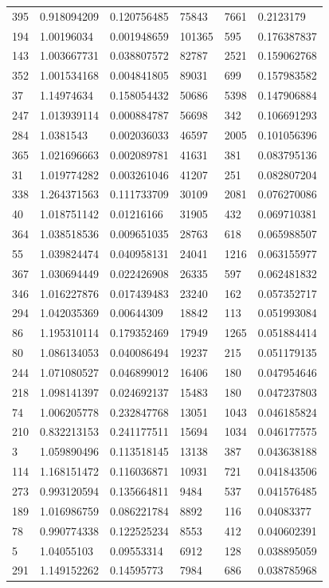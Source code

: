 \documentclass{cumcmthesis}
\begin{document}
\begin{longtable}{l|llll|l}
    395 & 0.918094209 & 0.120756485 & 75843  & 7661    & 0.2123179   \\
    194 & 1.00196034  & 0.001948659 & 101365 & 595     & 0.176387837 \\
    143 & 1.003667731 & 0.038807572 & 82787  & 2521    & 0.159062768 \\
    352 & 1.001534168 & 0.004841805 & 89031  & 699     & 0.157983582 \\
    37  & 1.14974634  & 0.158054432 & 50686  & 5398    & 0.147906884 \\
    247 & 1.013939114 & 0.000884787 & 56698  & 342     & 0.106691293 \\
    284 & 1.0381543   & 0.002036033 & 46597  & 2005    & 0.101056396 \\
    365 & 1.021696663 & 0.002089781 & 41631  & 381     & 0.083795136 \\
    31  & 1.019774282 & 0.003261046 & 41207  & 251     & 0.082807204 \\
    338 & 1.264371563 & 0.111733709 & 30109  & 2081    & 0.076270086 \\
    40  & 1.018751142 & 0.01216166  & 31905  & 432     & 0.069710381 \\
    364 & 1.038518536 & 0.009651035 & 28763  & 618     & 0.065988507 \\
    55  & 1.039824474 & 0.040958131 & 24041  & 1216    & 0.063155977 \\
    367 & 1.030694449 & 0.022426908 & 26335  & 597     & 0.062481832 \\
    346 & 1.016227876 & 0.017439483 & 23240  & 162     & 0.057352717 \\
    294 & 1.042035369 & 0.00644309  & 18842  & 113     & 0.051993084 \\
    86  & 1.195310114 & 0.179352469 & 17949  & 1265    & 0.051884414 \\
    80  & 1.086134053 & 0.040086494 & 19237  & 215     & 0.051179135 \\
    244 & 1.071080527 & 0.046899012 & 16406  & 180     & 0.047954646 \\
    218 & 1.098141397 & 0.024692137 & 15483  & 180     & 0.047237803 \\
    74  & 1.006205778 & 0.232847768 & 13051  & 1043    & 0.046185824 \\
    210 & 0.832213153 & 0.241177511 & 15694  & 1034    & 0.046177575 \\
    3   & 1.059890496 & 0.113518145 & 13138  & 387     & 0.043638188 \\
    114 & 1.168151472 & 0.116036871 & 10931  & 721     & 0.041843506 \\
    273 & 0.993120594 & 0.135664811 & 9484   & 537     & 0.041576485 \\
    189 & 1.016986759 & 0.086221784 & 8892   & 116     & 0.04083377  \\
    78  & 0.990774338 & 0.122525234 & 8553   & 412     & 0.040602391 \\
    5   & 1.04055103  & 0.09553314  & 6912   & 128     & 0.038895059 \\
    291 & 1.149152262 & 0.14595773  & 7984   & 686     & 0.038785968\\
    \bottomrule
    \end{longtable}
\end{document}

